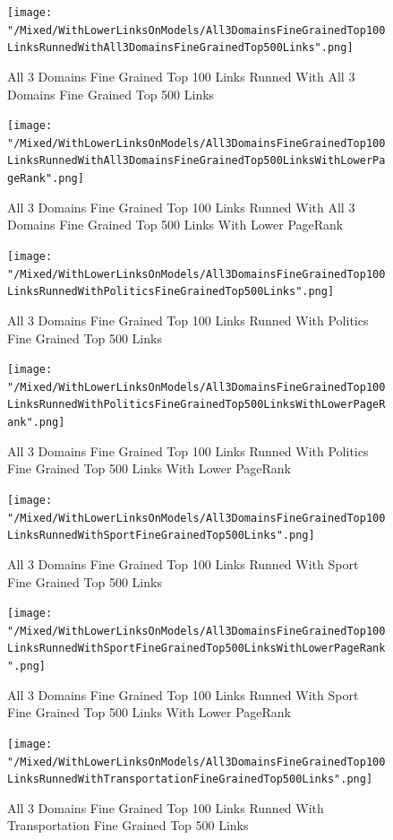 \documentclass[thesis=M,english]{FITthesis}[2018/05/30]
\begin{document}
	\begin{figure}[H]\centering
		\texttt{[image: "/Mixed/WithLowerLinksOnModels/All3DomainsFineGrainedTop100LinksRunnedWithAll3DomainsFineGrainedTop500Links".png]}
		\caption{All 3 Domains Fine Grained Top 100 Links Runned With All 3 Domains Fine Grained Top 500 Links}\label{}
	\end{figure}
	
	\begin{figure}[H]\centering
		\texttt{[image: "/Mixed/WithLowerLinksOnModels/All3DomainsFineGrainedTop100LinksRunnedWithAll3DomainsFineGrainedTop500LinksWithLowerPageRank".png]}
		\caption{All 3 Domains Fine Grained Top 100 Links Runned With All 3 Domains Fine Grained Top 500 Links With Lower PageRank}\label{}
	\end{figure}
	
	\begin{figure}[H]\centering
		\texttt{[image: "/Mixed/WithLowerLinksOnModels/All3DomainsFineGrainedTop100LinksRunnedWithPoliticsFineGrainedTop500Links".png]}
		\caption{All 3 Domains Fine Grained Top 100 Links Runned With Politics Fine Grained Top 500 Links}\label{}
	\end{figure}
	
	\begin{figure}[H]\centering
		\texttt{[image: "/Mixed/WithLowerLinksOnModels/All3DomainsFineGrainedTop100LinksRunnedWithPoliticsFineGrainedTop500LinksWithLowerPageRank".png]}
		\caption{All 3 Domains Fine Grained Top 100 Links Runned With Politics Fine Grained Top 500 Links With Lower PageRank}\label{}
	\end{figure}
	
	\begin{figure}[H]\centering
		\texttt{[image: "/Mixed/WithLowerLinksOnModels/All3DomainsFineGrainedTop100LinksRunnedWithSportFineGrainedTop500Links".png]}
		\caption{All 3 Domains Fine Grained Top 100 Links Runned With Sport Fine Grained Top 500 Links}\label{}
	\end{figure}
	
	\begin{figure}[H]\centering
		\texttt{[image: "/Mixed/WithLowerLinksOnModels/All3DomainsFineGrainedTop100LinksRunnedWithSportFineGrainedTop500LinksWithLowerPageRank".png]}
		\caption{All 3 Domains Fine Grained Top 100 Links Runned With Sport Fine Grained Top 500 Links With Lower PageRank}\label{}
	\end{figure}
	
	\begin{figure}[H]\centering
		\texttt{[image: "/Mixed/WithLowerLinksOnModels/All3DomainsFineGrainedTop100LinksRunnedWithTransportationFineGrainedTop500Links".png]}
		\caption{All 3 Domains Fine Grained Top 100 Links Runned With Transportation Fine Grained Top 500 Links}\label{}
	\end{figure}
\end{document}
